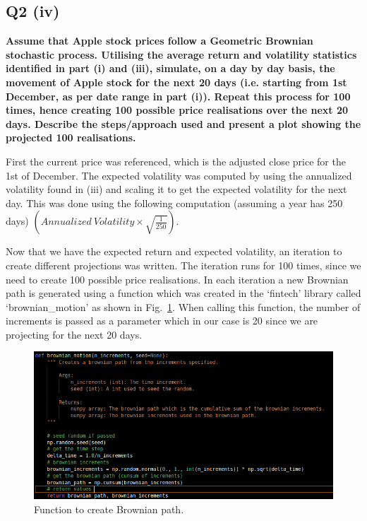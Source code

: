 

\subsection{Q2 (iv)}\label{sssec:pt2q2iv}
\textbf{Assume that Apple stock prices follow a Geometric Brownian stochastic process. Utilising the average return and volatility statistics identified in part (i) and (iii), simulate, on a day by day basis, the movement of Apple stock for the next 20 days (i.e. starting from 1st December, as per date range in part (i)). Repeat this process for 100 times, hence creating 100 possible price realisations over the next 20 days. Describe the steps/approach used and present a plot showing the projected 100 realisations.}

\noindent
First the current price was referenced, which is the adjusted close price for the 1st of December. The expected volatility was computed by using the annualized volatility found in (iii) and scaling it to get the expected volatility for the next day. This was done using the following computation (assuming a year has 250 days) $(Annualized \ Volatility \times \sqrt{\frac{1}{250}})$. 

\noindent
Now that we have the expected return and expected volatility, an iteration to create different projections was written. The iteration runs for 100 times, since we need to create 100 possible price realisations. In each iteration a new Brownian path is generated using a function which was created in the ‘fintech’ library called ‘brownian\_motion’ as shown in Fig.~\ref{fig:brownpath}. When calling this function, the number of increments is passed as a parameter which in our case is 20 since we are projecting for the next 20 days. 

\begin{figure}[H]
\centering
  \includegraphics[scale = .64]{imgs/brownian_path.png}
  \caption{Function to create Brownian path.}
  \label{fig:brownpath}
\end{figure}

